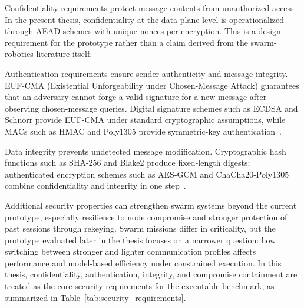 Confidentiality requirements protect message contents from unauthorized access. In the present thesis, confidentiality at the data-plane level is operationalized through AEAD schemes with unique nonces per encryption. This is a design requirement for the prototype rather than a claim derived from the swarm-robotics literature itself.

Authentication requirements ensure sender authenticity and message integrity. EUF-CMA (Existential Unforgeability under Chosen-Message Attack) guarantees that an adversary cannot forge a valid signature for a new message after observing chosen-message queries. Digital signature schemes such as ECDSA and Schnorr provide EUF-CMA under standard cryptographic assumptions, while MACs such as HMAC and Poly1305 provide symmetric-key authentication~\cite{nistFips198HMAC,rfc8439}.

Data integrity prevents undetected message modification. Cryptographic hash functions such as SHA-256 and Blake2 produce fixed-length digests; authenticated encryption schemes such as AES-GCM and ChaCha20-Poly1305 combine confidentiality and integrity in one step~\cite{nistSP80038DGCM,rfc8439}.

Additional security properties can strengthen swarm systems beyond the current prototype, especially resilience to node compromise and stronger protection of past sessions through rekeying. Swarm missions differ in criticality, but the prototype evaluated later in the thesis focuses on a narrower question: how switching between stronger and lighter communication profiles affects performance and model-based efficiency under constrained execution. In this thesis, confidentiality, authentication, integrity, and compromise containment are treated as the core security requirements for the executable benchmark, as summarized in Table~\ref{tab:security_requirements}.

